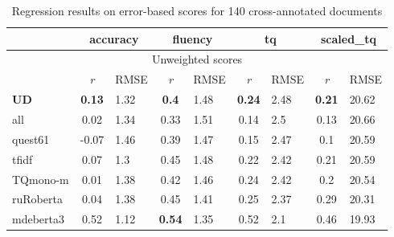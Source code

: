 \begin{table}[H]
	\centering
	\begin{tabular}{l|cl|cl|cl|cl}
		\toprule
		& \multicolumn{2}{c|}{accuracy} & \multicolumn{2}{c|}{\textbf{fluency}}  & \multicolumn{2}{c|}{tq} & \multicolumn{2}{c}{scaled\_tq}    \\
		\midrule
		\multicolumn{9}{c}{Unweighted scores} \\
		\midrule
		& \textit{r}        & RMSE & \textit{r}       & RMSE & \textit{r}    & RMSE & \textit{r}    & RMSE  \\
		\midrule
		\textbf{UD}                & \textbf{0.13}  & 1.32 & \textbf{0.4}     & 1.48 & \textbf{0.24}  & 2.48 & \textbf{0.21}       & 20.62 \\
		all               & 0.02  & 1.34 & 0.33    & 1.51 & 0.14  & 2.5  & 0.13       & 20.66 \\
		quest61           & -0.07 & 1.46 & 0.39    & 1.47 & 0.15  & 2.47 & 0.1        & 20.59 \\
		\midrule
		tfidf             & 0.07  & 1.3  & 0.45    & 1.48 & 0.22  & 2.42 & 0.21       & 20.59 \\
		\midrule
		TQmono-m          & 0.01  & 1.38 & 0.42    & 1.46 & 0.24  & 2.42 & 0.2        & 20.54 \\
		ruRoberta   & 0.04  & 1.38 & 0.45    & 1.41 & 0.25  & 2.37 & 0.29       & 20.31 \\
		mdeberta3    & 0.52  & 1.12 & \textbf{0.54}    & 1.35 & 0.52  & 2.1  & 0.46       & 19.93 \\
		\bottomrule
	\end{tabular}
	\caption{\label{tab:err140_res}Regression results on error-based scores for 140 cross-annotated documents}
\end{table}

